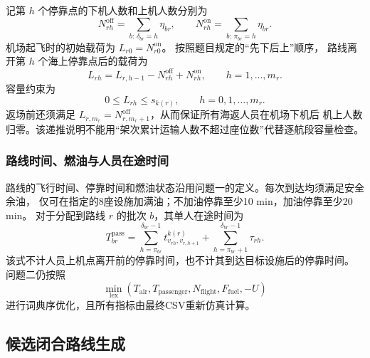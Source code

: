 \documentclass[UTF8,a4paper,zihao=5]{ctexart}
\begin{document}
记第 $h$ 个停靠点的下机人数和上机人数分别为
\begin{equation}
  N_{rh}^{\mathrm{off}}=\sum_{b:\,\delta_{br}=h}\eta_{br},
  \qquad
  N_{rh}^{\mathrm{on}}=\sum_{b:\,\pi_{br}=h}\eta_{br}.
  \label{eq:q2-pickup-delivery-count}
\end{equation}
机场起飞时的初始载荷为 $L_{r0}=N_{r0}^{\mathrm{on}}$。
按照题目规定的“先下后上”顺序，
路线离开第 $h$ 个海上停靠点后的载荷为
\begin{equation}
  L_{rh}=L_{r,h-1}-N_{rh}^{\mathrm{off}}+N_{rh}^{\mathrm{on}},
  \qquad h=1,\ldots,m_r.
  \label{eq:q2-load}
\end{equation}
容量约束为
\begin{equation}
  0\le L_{rh}\le s_{k(r)},
  \qquad h=0,1,\ldots,m_r.
  \label{eq:q2-capacity}
\end{equation}
返场前还须满足 $L_{r,m_r}=N_{r,m_r+1}^{\mathrm{off}}$，从而保证所有海返人员在机场下机后
机上人数归零。该递推说明不能用“架次累计运输人数不超过座位数”代替逐航段容量检查。

\subsubsection{路线时间、燃油与人员在途时间}

路线的飞行时间、停靠时间和燃油状态沿用问题一的定义。每次到达均须满足安全余油，
仅可在指定的8座设施加满油；不加油停靠至少10 min，加油停靠至少20 min。
对于分配到路线 $r$ 的批次 $b$，其单人在途时间为
\begin{equation}
  T_{br}^{\mathrm{pass}}
  =\sum_{h=\pi_{br}}^{\delta_{br}-1}
  t_{v_{rh},v_{r,h+1}}^{k(r)}
  +\sum_{h=\pi_{br}+1}^{\delta_{br}-1}\tau_{rh}.
  \label{eq:q2-passenger-time}
\end{equation}
该式不计人员上机点离开前的停靠时间，也不计其到达目标设施后的停靠时间。
问题二仍按照
\begin{equation}
  \min_{\mathrm{lex}}
  \left(T_{\mathrm{air}},T_{\mathrm{passenger}},
  N_{\mathrm{flight}},F_{\mathrm{fuel}},-U\right)
  \label{eq:q2-objective}
\end{equation}
进行词典序优化，且所有指标由最终CSV重新仿真计算。

\subsection{候选闭合路线生成}
\end{document}
